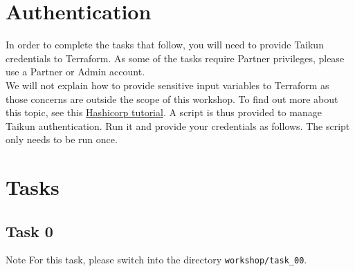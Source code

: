 \section{Authentication}
In order to complete the tasks that follow, you will need to provide Taikun credentials to Terraform.
As some of the tasks require Partner privileges, please use a Partner or Admin account.\\

We will not explain how to provide sensitive input variables to Terraform as those concerns are outside the scope of this
workshop. %
To find out more about this topic, see this \href{https://learn.hashicorp.com/tutorials/terraform/sensitive-variables}{Hashicorp tutorial}.
A script is thus provided to manage Taikun authentication.
Run it and provide your credentials as follows. The script only needs to be run once.


\section{Tasks}
\subsection{Task 0}

\begin{tip}{Note}
  For this task, please switch into the directory \texttt{workshop/task\_00}.
\end{tip}

\blindtext{}
